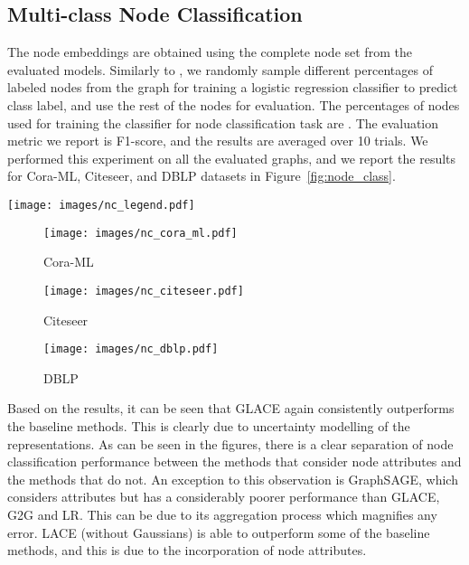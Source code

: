 \documentclass[runningheads]{llncs}
\begin{document}
\subsection{Multi-class Node Classification}

The node embeddings are obtained using the complete node set from the evaluated models. Similarly to \cite{DBLP:line,g2g}, we randomly sample different percentages of labeled nodes from the graph for training a logistic regression classifier to predict class label, and use the rest of the nodes for evaluation. The percentages of nodes used for training the classifier for node classification task are . The evaluation metric we report is F1-score, and the results are averaged over 10 trials. We performed this experiment on all the evaluated graphs, and we report the results for Cora-ML, Citeseer, and DBLP datasets in Figure~\ref{fig:node_class}.

\begin{figure*}[t]
    \begin{minipage}{\textwidth}
        \centering
        \texttt{[image: images/nc\_legend.pdf]}
    \end{minipage}
    
    \begin{minipage}{\textwidth}
        \centering
        \begin{subfigure}{0.32\textwidth}
            \texttt{[image: images/nc\_cora\_ml.pdf]}
            \caption{Cora-ML}
            \label{fig:cora_ml}
        \end{subfigure}
        \begin{subfigure}{0.32\textwidth}
            \texttt{[image: images/nc\_citeseer.pdf]}
            \caption{Citeseer}
            \label{fig:citeseer}
        \end{subfigure}
        \begin{subfigure}{0.32\textwidth}
            \texttt{[image: images/nc\_dblp.pdf]}
            \caption{DBLP}
            \label{fig:dblp}
        \end{subfigure}
    \end{minipage}
    \caption{\small Node classification performance. Improvements of GLACE are statistically significant for  estimated by a paired t-test.}
    \label{fig:node_class}
    \vspace{-5mm}
\end{figure*}

Based on the results, it can be seen that GLACE again consistently outperforms the baseline methods. This is clearly due to uncertainty modelling of the representations. As can be seen in the figures, there is a clear separation of node classification performance between the methods that consider node attributes and the methods that do not. An exception to this observation is GraphSAGE, which considers attributes but has a considerably poorer performance than GLACE, G2G and LR. 
This can be due to its aggregation process which magnifies any error.
LACE (without Gaussians) is able to outperform some of the baseline methods, and this is due to the incorporation of node attributes.
\end{document}
